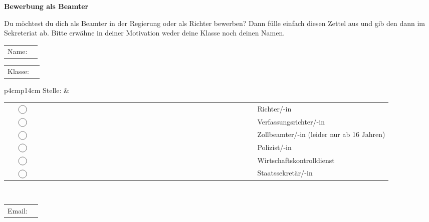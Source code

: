 \documentclass[12pt]{article}
\newcommand{\kreis}{
    $\vcenter{\begin{tikzpicture}
        \draw (0,0) circle (0.2cm);
    \end{tikzpicture}}$
}
\begin{document}
\textbf{\LARGE{Bewerbung als Beamter}}

\vspace{0.5cm}

Du möchtest du dich als Beamter in der Regierung oder als Richter bewerben? Dann fülle einfach
diesen Zettel aus und gib den dann im Sekreteriat ab. Bitte erwähne in deiner Motivation weder
deine Klasse noch deinen Namen.

\renewcommand{\arraystretch}{1.5}

\vspace{1cm}

\begin{tabular}{p{4cm}p{14cm}}
    Name: & \dotfill \\
\end{tabular}

\vspace{3mm}
\begin{tabular}{p{4cm}p{14cm}}
    Klasse: & \dotfill \\
\end{tabular}

\vspace{3mm}
\begin{tabular}{p{4cm}p{14cm}}
    Stelle: &
    \begin{tabular}[t]{p{1cm}p{8cm}}
        \kreis & Richter/-in \\
        \kreis & Verfassungsrichter/-in \\
        \kreis & Zollbeamter/-in (leider nur ab 16 Jahren) \\
        \kreis & Polizist/-in\\
        \kreis & Wirtschaftskontrolldienst \\
        \kreis & Staatssekretär/-in \\
    \end{tabular}
    \\
\end{tabular}

\vspace{3mm}
\begin{tabular}{p{4cm}p{14cm}}
    Email: & \dotfill \\
\end{tabular}
\end{document}
